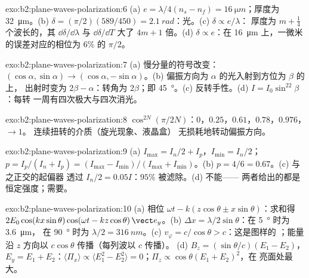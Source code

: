 \begin{solution}{exo:b2:plane-waves-polarization:6}
(a) $e = \lambda/4(n_s - n_f) = \qty{16}{\micro m}$；厚度为 \qty{32}{\micro m}。(b) $\delta =
(\pi/2)(589/450) = \qty{2.1}{rad}$：光。(c) $\delta \propto e/\lambda$：
厚度为 $m + \tfrac14$ 个波长的，其 $\dd\delta/\dd\lambda$ 与 $\dd\delta/\dd T$ 大了
$4m + 1$ 倍。(d) $\delta \propto e$：在 \qty{16}{\micro m} 上，一微米的误差对应的相位为 $6\%$ 的 $\pi/2$。
\end{solution}

\begin{solution}{exo:b2:plane-waves-polarization:7}
(a) 慢分量的符号改变：$(\cos\alpha, \sin\alpha) \to (\cos\alpha,
-\sin\alpha)$。(b) 偏振方向为 $\alpha$ 的光入射到方位为 $\beta$ 的上，
出射时变为 $2\beta - \alpha$：转角为 $2\beta$；即 \qty{45}{\degree}。(c)
反转手性。(d) $I = I_0\sin^22\beta$：每转
一周有四次极大与四次消光。
\end{solution}

\begin{solution}{exo:b2:plane-waves-polarization:8}
$\cos^{2N}(\pi/2N)$：$0$，$0.25$，$0.61$，$0.78$，$0.976$，$\to 1$。
连续扭转的介质（旋光现象、液晶盒）
无损耗地转动偏振方向。
\end{solution}

\begin{solution}{exo:b2:plane-waves-polarization:9}
(a) $I_{\max} = I_n/2 + I_p$，$I_{\min} = I_n/2$；$p = I_p/(I_n + I_p) = (I_{\max} -
I_{\min})/(I_{\max} + I_{\min})$。(b) $p = 4/6 = 0.67$。(c) 与之正交的起偏器
透过 $I_n/2 = 0.05I$：$95\%$ 被滤除。(d) 不能——
两者给出的都是恒定强度；需要。
\end{solution}

\begin{solution}{exo:b2:plane-waves-polarization:10}
(a) 相位 $\omega t - k(z\cos\theta \pm x\sin\theta)$：求和得 $2E_0\cos(kx\sin\theta)\cos(\omega t
- kz\cos\theta)\,\vect e_y$。(b) $\Delta x = \lambda/2\sin\theta$：在 \qty{5}{\degree} 时为 \qty{3.6}{\micro m}，
在 \qty{90}{\degree} 时为 $\lambda/2 = \qty{316}{nm}$。(c) $v_\varphi = c/\cos\theta > c$：这是图样的
；能量沿 $z$ 方向以 $c\cos\theta$ 传播（每列波以 $c$ 传播）。
(d) $B_z = (\sin\theta/c)(E_1 - E_2)$，$E_y = E_1 + E_2$：$\langle\Pi_x\rangle \propto
\langle E_1^2 - E_2^2\rangle = 0$；$\Pi_z \propto \cos\theta(E_1 + E_2)^2$，在
亮面处最大。
\end{solution}

